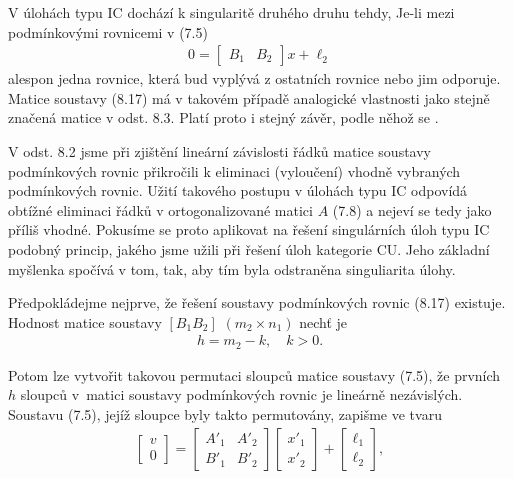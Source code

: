 V úlohách typu IC dochází k singularitě druhého druhu tehdy,
Je-li mezi podmínkovými rovnicemi v (7.5)
%
\begin{align*}
  \tag{8.17}
  0 = \left[
    \begin{array}{cc}
      B_1 & B_2
    \end{array}
    \right] x + \ell_2
\end{align*}
%
alespon jedna rovnice, která bud vyplývá z ostatních rovnice
nebo jim odporuje. Matice soustavy (8.17) má v takovém případě
analogické vlastnosti jako stejně značená matice v odst. 8.3. Platí
proto i stejný závěr, podle něhož se .

V odst. 8.2 jsme při zjištění lineární závislosti řádků matice
soustavy podmínkových rovnic přikročili k eliminaci (vyloučení) vhodně
vybraných podmínkových rovnic. Užití takového postupu v úlohách typu
IC odpovídá obtížné eliminaci řádků v ortogonalizované matici $A$
(7.8) a nejeví se tedy jako příliš vhodné.  Pokusíme se proto
aplikovat na řešení singulárních úloh typu IC podobný princip, jakého
jsme užili při řešení úloh kategorie CU.  Jeho základní myšlenka
spočívá v tom, 
tak, aby tím byla odstraněna singuliarita úlohy.


Předpokládejme nejprve, že řešení soustavy podmínkových rovnic (8.17)
existuje. Hodnost matice soustavy $[B_1 B_2 ]$ $(m_2 \times n_1)$
nechť je
%
\begin{align*}
  \tag{8.18}
  h = m_2 -k, \quad k > 0.
\end{align*}

\noindent
Potom lze vytvořit takovou permutaci sloupců matice soustavy (7.5),
že prvních $h$ sloupců v~matici soustavy podmínkových rovnic je
lineárně nezávislých. Soustavu (7.5), jejíž sloupce byly takto
permutovány, zapišme ve tvaru
%
\begin{align*}
  \tag{8.19}
  \left[
    \begin{array}{c}
      v \\ 0
    \end{array}\right]
    =
    \left[\begin{array}{cc}
      A'_1  & A'_2 \\
      B'_1  & B'_2
      \end{array}\right]
    \left[
      \begin{array}{c}
        x'_1 \\ x'_2
      \end{array}\right]
    +
    \left[
      \begin{array}{c}
        \ell_1 \\ \ell_2
      \end{array}\right]{,}
\end{align*}

